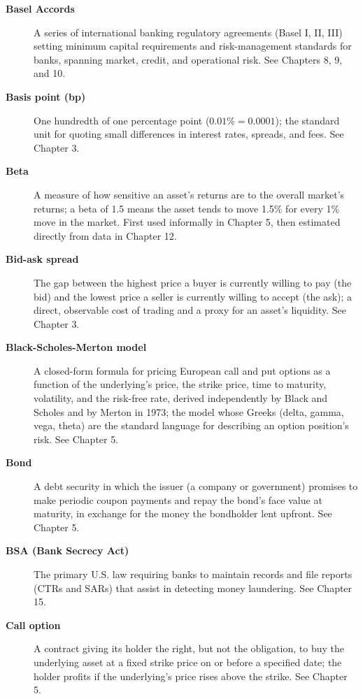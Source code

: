 \documentclass[../ai_in_finance]{subfiles}
\begin{document}
\begin{description}
\item[\textbf{Basel Accords}] A series of international banking regulatory agreements (Basel I, II, III) setting minimum capital requirements and risk-management standards for banks, spanning market, credit, and operational risk. See Chapters 8, 9, and 10.

\item[\textbf{Basis point (bp)}] One hundredth of one percentage point ($0.01\% = 0.0001$); the standard unit for quoting small differences in interest rates, spreads, and fees. See Chapter 3.

\item[\textbf{Beta}] A measure of how sensitive an asset's returns are to the overall market's returns; a beta of 1.5 means the asset tends to move 1.5\% for every 1\% move in the market. First used informally in Chapter 5, then estimated directly from data in Chapter 12.

\item[\textbf{Bid-ask spread}] The gap between the highest price a buyer is currently willing to pay (the bid) and the lowest price a seller is currently willing to accept (the ask); a direct, observable cost of trading and a proxy for an asset's liquidity. See Chapter 3.

\item[\textbf{Black-Scholes-Merton model}] A closed-form formula for pricing European call and put options as a function of the underlying's price, the strike price, time to maturity, volatility, and the risk-free rate, derived independently by Black and Scholes and by Merton in 1973; the model whose Greeks (delta, gamma, vega, theta) are the standard language for describing an option position's risk. See Chapter 5.

\item[\textbf{Bond}] A debt security in which the issuer (a company or government) promises to make periodic coupon payments and repay the bond's face value at maturity, in exchange for the money the bondholder lent upfront. See Chapter 5.

\item[\textbf{BSA (Bank Secrecy Act)}] The primary U.S. law requiring banks to maintain records and file reports (CTRs and SARs) that assist in detecting money laundering. See Chapter 15.

\item[\textbf{Call option}] A contract giving its holder the right, but not the obligation, to buy the underlying asset at a fixed strike price on or before a specified date; the holder profits if the underlying's price rises above the strike. See Chapter 5.


\end{description}
\end{document}
